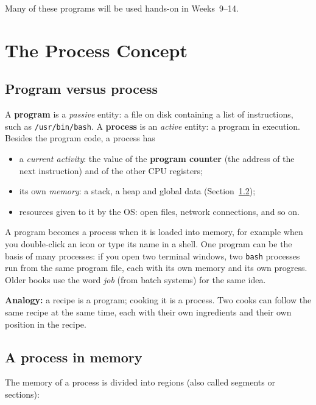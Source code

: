 \documentclass[11pt,a4paper]{article}
\newcommand{\term}[1]{\textbf{\color{mintdeep}#1}}
\begin{document}
Many of these programs will be used hands-on in Weeks~9--14.

\section{The Process Concept}
\label{sec:process}

\subsection{Program versus process}

A \term{program} is a \emph{passive} entity: a file on disk containing a list of instructions, such as \texttt{/usr/bin/bash}. A \term{process} is an \emph{active} entity: a program in execution. Besides the program code, a process has
\begin{itemize}
  \item a \emph{current activity}: the value of the \term{program counter} (the address of the next instruction) and of the other CPU registers;
  \item its own \emph{memory}: a stack, a heap and global data (Section~\ref{sec:layout});
  \item resources given to it by the OS: open files, network connections, and so on.
\end{itemize}

A program becomes a process when it is loaded into memory, for example when you double-click an icon or type its name in a shell. One program can be the basis of many processes: if you open two terminal windows, two \texttt{bash} processes run from the same program file, each with its own memory and its own progress. Older books use the word \emph{job} (from batch systems) for the same idea.

\textbf{Analogy:} a recipe is a program; cooking it is a process. Two cooks can follow the same recipe at the same time, each with their own ingredients and their own position in the recipe.

\subsection{A process in memory}
\label{sec:layout}

The memory of a process is divided into regions (also called segments or sections):
\end{document}
